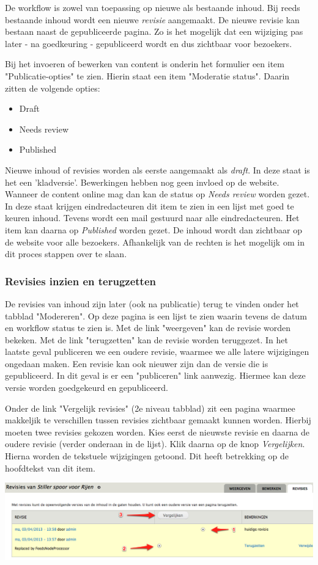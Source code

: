De workflow is zowel van toepassing op nieuwe als bestaande inhoud. Bij reeds bestaande inhoud wordt een nieuwe \emph{revisie} aangemaakt. De nieuwe revisie kan bestaan naast de gepubliceerde pagina. Zo is het mogelijk dat een wijziging pas later - na goedkeuring - gepubliceerd wordt en dus zichtbaar voor bezoekers.

Bij het invoeren of bewerken van content is onderin het formulier een item "Publicatie-opties" te zien. Hierin staat een item "Moderatie status". Daarin zitten de volgende opties:
\begin{itemize}
\item Draft
\item Needs review
\item Published
\end{itemize}
Nieuwe inhoud of revisies worden als eerste aangemaakt als \emph{draft}. In deze staat is het een 'kladversie'. Bewerkingen hebben nog geen invloed op de website. Wanneer de content online mag dan kan de status op \emph{Needs review} worden gezet. In deze staat krijgen eindredacteuren dit item te zien in een lijst met goed te keuren inhoud. Tevens wordt een mail gestuurd naar alle eindredacteuren. Het item kan daarna op \emph{Published} worden gezet. De inhoud wordt dan zichtbaar op de website voor alle bezoekers. Afhankelijk van de rechten is het mogelijk om in dit proces stappen over te slaan.

\subsubsection{Revisies inzien en terugzetten}\label{modererentab}

De revisies van inhoud zijn later (ook na publicatie) terug te vinden onder het tabblad "Modereren". Op deze pagina is een lijst te zien waarin tevens de datum en workflow status te zien is. Met de link "weergeven" kan de revisie worden bekeken. Met de link "terugzetten" kan de revisie worden teruggezet. In het laatste geval publiceren we een oudere revisie, waarmee we alle latere wijzigingen ongedaan maken. Een revisie kan ook nieuwer zijn dan de versie die is gepubliceerd. In dit geval is er een "publiceren" link aanwezig. Hiermee kan deze versie worden goedgekeurd en gepubliceerd.

Onder de link "Vergelijk revisies" (2e niveau tabblad) zit een pagina waarmee makkeljik te verschillen tussen revisies zichtbaar gemaakt kunnen worden. Hierbij moeten twee revisies gekozen worden. Kies eerst de nieuwste revisie en daarna de oudere revisie (verder onderaan in de lijst). Klik daarna op de knop \emph{Vergelijken}. Hierna worden de tekstuele wijzigingen getoond. Dit heeft betrekking op de hoofdtekst van dit item.
\begin{center}
\includegraphics[width=\textwidth]{img/revisies3.png}
\end{center}

